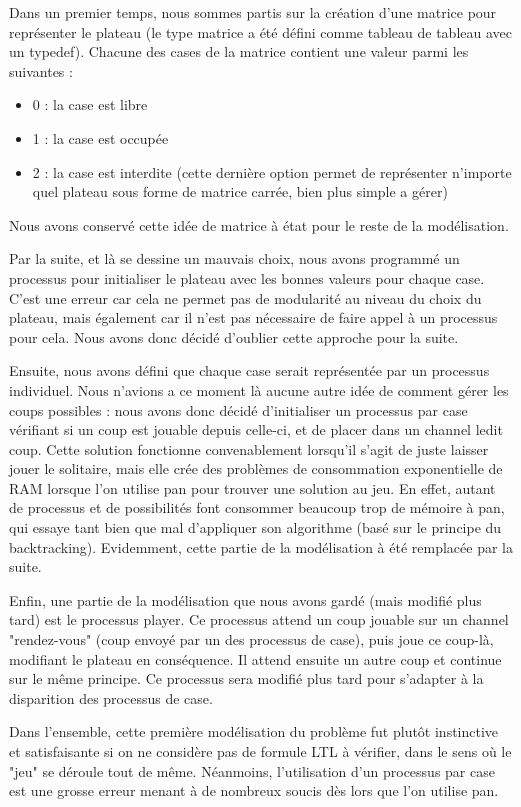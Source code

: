\documentclass[12pt, a4paper]{report}
\begin{document}
Dans un premier temps, nous sommes partis sur la création d'une matrice pour représenter le plateau (le type matrice a été défini comme tableau de tableau avec un typedef). Chacune des cases de la matrice contient une valeur parmi les suivantes :
\begin{itemize}
\item 0 : la case est libre
\item 1 : la case est occupée
\item 2 : la case est interdite (cette dernière option permet de représenter n'importe quel plateau sous forme de matrice carrée, bien plus simple a gérer)
\end{itemize}
Nous avons conservé cette idée de matrice à état pour le reste de la modélisation.

Par la suite, et là se dessine un mauvais choix, nous avons programmé un processus pour initialiser le plateau avec les bonnes valeurs pour chaque case. C'est une erreur car cela ne permet pas de modularité au niveau du choix du plateau, mais également car il n'est pas nécessaire de faire appel à un processus pour cela. Nous avons donc décidé d'oublier cette approche pour la suite.

Ensuite, nous avons défini que chaque case serait représentée par un processus individuel. Nous n'avions a ce moment là aucune autre idée de comment gérer les coups possibles : nous avons donc décidé d'initialiser un processus par case vérifiant si un coup est jouable depuis celle-ci, et de placer dans un channel ledit coup. Cette solution fonctionne convenablement lorsqu'il s'agit de juste laisser jouer le solitaire, mais elle crée des problèmes de consommation exponentielle de RAM lorsque l'on utilise pan pour trouver une solution au jeu. En effet, autant de processus et de possibilités font consommer beaucoup trop de mémoire à pan, qui essaye tant bien que mal d'appliquer son algorithme (basé sur le principe du backtracking). Evidemment, cette partie de la modélisation à été remplacée par la suite.

Enfin, une partie de la modélisation que nous avons gardé (mais modifié plus tard) est le processus player. Ce processus attend un coup jouable sur un channel "rendez-vous" (coup envoyé par un des processus de case), puis joue ce coup-là, modifiant le plateau en conséquence. Il attend ensuite un autre coup et continue sur le même principe. Ce processus sera modifié plus tard pour s'adapter à la disparition des processus de case.

Dans l'ensemble, cette première modélisation du problème fut plutôt instinctive et satisfaisante si on ne considère pas de formule LTL à vérifier, dans le sens où le "jeu" se déroule tout de même. Néanmoins, l'utilisation d'un processus par case est une grosse erreur menant à de nombreux soucis dès lors que l'on utilise pan.
\end{document}
